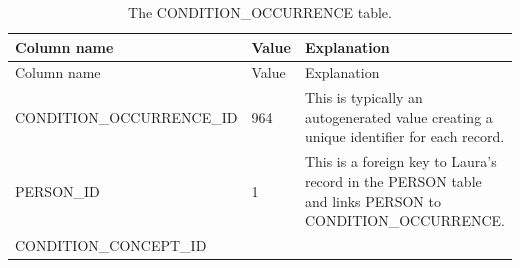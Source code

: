 \documentclass[11pt]{book}
\theoremstyle{definition}
\theoremstyle{definition}
\theoremstyle{definition}
\theoremstyle{remark}
\begin{document}
\begin{longtable}[]{@{}lll@{}}
\caption{\label{tab:conditionOccurrence} The CONDITION\_OCCURRENCE table.}\tabularnewline
\toprule
\begin{minipage}[b]{0.28\columnwidth}\raggedright
Column name\strut
\end{minipage} & \begin{minipage}[b]{0.15\columnwidth}\raggedright
Value\strut
\end{minipage} & \begin{minipage}[b]{0.49\columnwidth}\raggedright
Explanation\strut
\end{minipage}\tabularnewline
\midrule
\endfirsthead
\toprule
\begin{minipage}[b]{0.28\columnwidth}\raggedright
Column name\strut
\end{minipage} & \begin{minipage}[b]{0.15\columnwidth}\raggedright
Value\strut
\end{minipage} & \begin{minipage}[b]{0.49\columnwidth}\raggedright
Explanation\strut
\end{minipage}\tabularnewline
\midrule
\endhead
\begin{minipage}[t]{0.28\columnwidth}\raggedright
CONDITION\_OCCURRENCE\_ID\strut
\end{minipage} & \begin{minipage}[t]{0.15\columnwidth}\raggedright
964\strut
\end{minipage} & \begin{minipage}[t]{0.49\columnwidth}\raggedright
This is typically an autogenerated value creating a unique identifier for each record.\strut
\end{minipage}\tabularnewline
\begin{minipage}[t]{0.28\columnwidth}\raggedright
PERSON\_ID\strut
\end{minipage} & \begin{minipage}[t]{0.15\columnwidth}\raggedright
1\strut
\end{minipage} & \begin{minipage}[t]{0.49\columnwidth}\raggedright
This is a foreign key to Laura's record in the PERSON table and links PERSON to CONDITION\_OCCURRENCE.\strut
\end{minipage}\tabularnewline
\begin{minipage}[t]{0.28\columnwidth}\raggedright
CONDITION\_CONCEPT\_ID\strut
\end{minipage} & \begin{minipage}[t]{0.15\columnwidth}\raggedright

\end{minipage}
\end{longtable}
\end{document}
